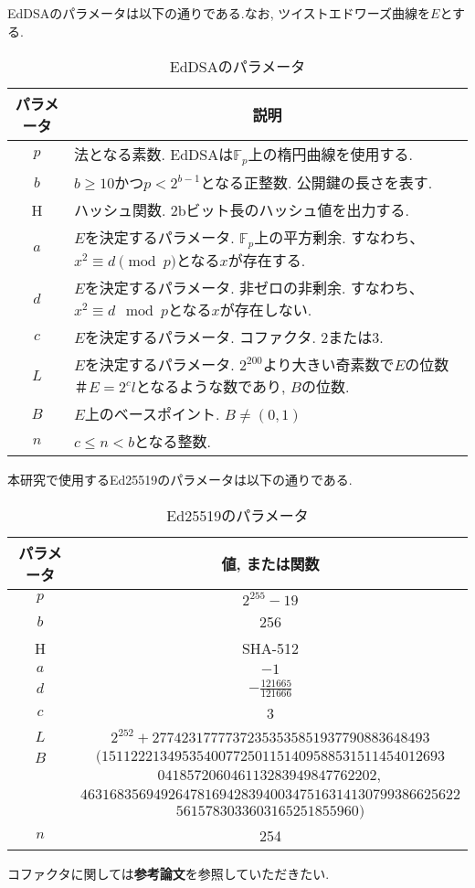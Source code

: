 EdDSAのパラメータは以下の通りである.なお, ツイストエドワーズ曲線を$E$とする.\\
\begin{table}[h]
  \caption{EdDSAのパラメータ}
  \centering
  \begin{tabular}{cp{10cm}}
    \hline
    \multicolumn{1}{c}{パラメータ} & \multicolumn{1}{c}{説明} \\ \hline \hline
    $p$ & 法となる素数. EdDSAは$\mathbb{F}_p$上の楕円曲線を使用する.\\
    $b$ & $b\geq 10$かつ$p<2^{b-1}$となる正整数. 公開鍵の長さを表す.\\
    H & ハッシュ関数. 2bビット長のハッシュ値を出力する. \\
    $a$ & $E$を決定するパラメータ. $\mathbb{F}_p$上の平方剰余. すなわち、$x^2\equiv d \pmod{p}$となる$x$が存在する.\\
    $d$ & $E$を決定するパラメータ. 非ゼロの非剰余. すなわち、$x^2\equiv d \mod{p}$となる$x$が存在しない.\\
    $c$ & $E$を決定するパラメータ. コファクタ. $2$または$3$.\\
    $L$ & $E$を決定するパラメータ. $2^{200}$より大きい奇素数で$E$の位数$＃E=2^{c}l$となるような数であり, $B$の位数.\\
    $B$ & $E$上のベースポイント. $B\neq (0,1)$\\
    $n$ & $c\leq n < b$となる整数.\\ \hline
  \end{tabular}
\end{table}

本研究で使用するEd25519のパラメータは以下の通りである.\\
\begin{longtable}{cc}
  \caption{Ed25519のパラメータ}
  \endfirsthead
  \hline
  \multicolumn{1}{c}{パラメータ} & \multicolumn{1}{c}{値, または関数} \\ \hline \hline
  $p$ & $2^{255}-19$ \\
  $b$ & 256 \\
  H & SHA-512 \\
  $a$ & $-1$ \\
  $d$ & $-\frac{121665}{121666}$ \\
  $c$ & 3 \\
  $L$ & $2^{252} + 27742317777372353535851937790883648493$ \\
  $B$ & $(15112221349535400772501151409588531511454012693$ \\
  & $041857206046113283949847762202,$\\
  & $4631683569492647816942839400347516314130799386625622$ \\
  & $5615783033603165251855960)$ \\
  $n$ & 254 \\ \hline
\end{longtable}


コファクタに関しては\textbf{参考論文}を参照していただきたい.